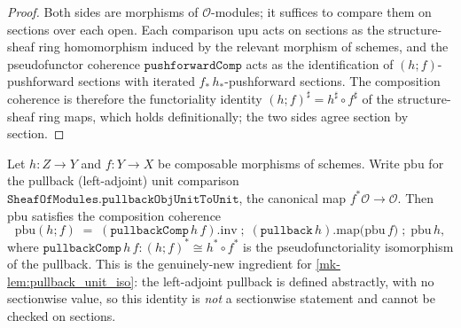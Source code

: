 \begin{proof}
  \leanok


Both sides are morphisms of \(\mathcal{O}\)-modules; it suffices to compare them on
  sections over each open. Each comparison \(\mathrm{upu}\) acts on sections as the
  structure-sheaf ring homomorphism induced by the relevant morphism of schemes, and the
  pseudofunctor coherence \(\mathtt{pushforwardComp}\) acts as the identification of
  \((h \mathbin{;} f)\)-pushforward sections with iterated \(f_*\,h_*\)-pushforward
  sections. The composition coherence is therefore the functoriality identity
  \((h \mathbin{;} f)^\sharp = h^\sharp \circ f^\sharp\) of the structure-sheaf ring maps,
  which holds definitionally; the two sides agree section by section.
\end{proof}

\begin{lemma}\label{mk-lem:pullbackObjUnitToUnit_comp}
  \leanok

  Let \(h : Z \to Y\) and \(f : Y \to X\) be composable morphisms of schemes. Write
  \(\mathrm{pbu}\) for the pullback (left-adjoint) unit comparison
  \(\mathtt{SheafOfModules.pullbackObjUnitToUnit}\), the canonical map
  \(f^*\mathcal{O} \to \mathcal{O}\). Then \(\mathrm{pbu}\) satisfies the composition
  coherence
  \[
    \mathrm{pbu}(h \mathbin{;} f)
      \;=\;
    (\mathtt{pullbackComp}\,h\,f).\mathrm{inv} \;\mathbin{;}\;
      (\mathtt{pullback}\,h).\mathrm{map}\bigl(\mathrm{pbu}\,f\bigr) \;\mathbin{;}\;
      \mathrm{pbu}\,h,
  \]
  where \(\mathtt{pullbackComp}\,h\,f : (h \mathbin{;} f)^* \cong h^* \circ f^*\) is the
  pseudofunctoriality isomorphism of the pullback. This is the genuinely-new ingredient
  for \ref{mk-lem:pullback_unit_iso}: the left-adjoint pullback is defined abstractly, with
  no sectionwise value, so this identity is \emph{not} a sectionwise statement and cannot
  be checked on sections.
\end{lemma}

